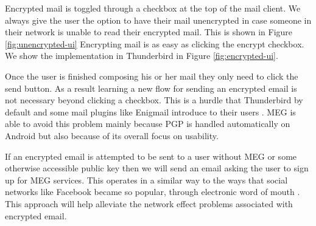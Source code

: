 \documentclass[11pt]{article}
\begin{document}
\par Encrypted mail is toggled through a checkbox at the top of the mail client. We always give the user the option to have their mail unencrypted in case someone in their network is unable to read their encrypted mail. This is shown in Figure \ref{fig:unencrypted-ui} Encrypting mail is as easy as clicking the encrypt checkbox. We show the implementation in Thunderbird in Figure \ref{fig:encrypted-ui}.
\par Once the user is finished composing his or her mail they only need to click the send button. As a result learning a new flow for sending an encrypted email is not necessary beyond clicking a checkbox. This is a hurdle that Thunderbird by default and some mail plugins like Enigmail introduce to their users \cite{enigmail-handbook}. MEG is able to avoid this problem mainly because PGP is handled automatically on Android but also because of its overall focus on usability.
\par If an encrypted email is attempted to be sent to a user without MEG or some otherwise accessible public key then we will send an email asking the user to sign up for MEG services. This operates in a similar way to the ways that social networks like Facebook became so popular, through electronic word of mouth \cite{trusov2009effects}. This approach will help alleviate the network effect problems associated with encrypted email.
\end{document}

